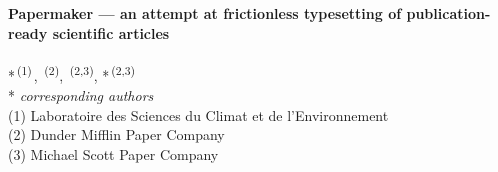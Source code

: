{
  \raggedright
  \sffamily
  {\huge\bfseries
    Papermaker — an attempt at frictionless typesetting of publication-ready scientific articles\\\mbox{}
  }\\
  \vspace{4mm}
  {\large
    \href{mailto:daeron@lsce.ipsl.fr}{\color{black}{M. Daëron}}*\textsuperscript{\,(1)\,{}}, \href{mailto:kevin@dmpc.com}{\color{black}{K. Malone}}\textsuperscript{\,(2)}, \href{mailto:pam@dmpc.com}{\color{black}{P. M. Beesly-Halpert}}\textsuperscript{\,(2,3)}, \href{mailto:micheal@mspc.com}{\color{black}{M. G. Scott}}*\textsuperscript{\,(2,3)}
  }\\
  \vspace{8mm}
  {\small
    * {\itshape corresponding authors}\\
    (1) Laboratoire des Sciences du Climat et de l'Environnement\\
    (2) Dunder Mifflin Paper Company\\
    (3) Michael Scott Paper Company\\
  }
}